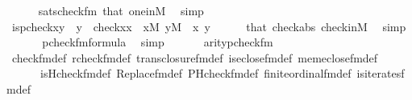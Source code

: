 \begin{isabellebody}
\ \ \ \ \isamarkupfalse%
\ sats{\isacharunderscore}{\kern0pt}check{\isacharunderscore}{\kern0pt}fm\ that\ one{\isacharunderscore}{\kern0pt}in{\isacharunderscore}{\kern0pt}M\ \isamarkupfalse%
\ simp\isanewline
\ \ \isamarkupfalse%
\isanewline
\ \ \isamarkupfalse%
\ {\isachardoublequoteopen}{\isacharquery}{\kern0pt}is{\isacharunderscore}{\kern0pt}pcheck{\isacharparenleft}{\kern0pt}x{\isacharcomma}{\kern0pt}y{\isacharparenright}{\kern0pt}\ {\isasymlongleftrightarrow}\ y\ {\isacharequal}{\kern0pt}\ {\isasymlangle}check{\isacharparenleft}{\kern0pt}x{\isacharparenright}{\kern0pt}{\isacharcomma}{\kern0pt}x{\isasymrangle}{\isachardoublequoteclose}\ \ {\isachardoublequoteopen}x{\isasymin}M{\isachardoublequoteclose}\ {\isachardoublequoteopen}y{\isasymin}M{\isachardoublequoteclose}\ \ x\ y\isanewline
\ \ \ \ \isamarkupfalse%
\ that\ check{\isacharunderscore}{\kern0pt}abs\ check{\isacharunderscore}{\kern0pt}in{\isacharunderscore}{\kern0pt}M\ \isamarkupfalse%
\ simp\isanewline
\ \ \isamarkupfalse%
\isanewline
\ \ \isamarkupfalse%
\ {\isachardoublequoteopen}{\isacharquery}{\kern0pt}pcheck{\isacharunderscore}{\kern0pt}fm{\isasymin}formula{\isachardoublequoteclose}\ \isamarkupfalse%
\ simp\isanewline
\ \ \isamarkupfalse%
\isanewline
\ \ \isamarkupfalse%
\ {\isachardoublequoteopen}arity{\isacharparenleft}{\kern0pt}{\isacharquery}{\kern0pt}pcheck{\isacharunderscore}{\kern0pt}fm{\isacharparenright}{\kern0pt}{\isacharequal}{\kern0pt}{}{\isachardoublequoteclose}\isanewline
\ \ \ \ \isamarkupfalse%
\ check{\isacharunderscore}{\kern0pt}fm{\isacharunderscore}{\kern0pt}def\ rcheck{\isacharunderscore}{\kern0pt}fm{\isacharunderscore}{\kern0pt}def\ trans{\isacharunderscore}{\kern0pt}closure{\isacharunderscore}{\kern0pt}fm{\isacharunderscore}{\kern0pt}def\ is{\isacharunderscore}{\kern0pt}eclose{\isacharunderscore}{\kern0pt}fm{\isacharunderscore}{\kern0pt}def\ mem{\isacharunderscore}{\kern0pt}eclose{\isacharunderscore}{\kern0pt}fm{\isacharunderscore}{\kern0pt}def\isanewline
\ \ \ \ \ \ is{\isacharunderscore}{\kern0pt}Hcheck{\isacharunderscore}{\kern0pt}fm{\isacharunderscore}{\kern0pt}def\ Replace{\isacharunderscore}{\kern0pt}fm{\isacharunderscore}{\kern0pt}def\ PHcheck{\isacharunderscore}{\kern0pt}fm{\isacharunderscore}{\kern0pt}def\ finite{\isacharunderscore}{\kern0pt}ordinal{\isacharunderscore}{\kern0pt}fm{\isacharunderscore}{\kern0pt}def\ is{\isacharunderscore}{\kern0pt}iterates{\isacharunderscore}{\kern0pt}fm{\isacharunderscore}{\kern0pt}def\isanewline

\end{isabellebody}

